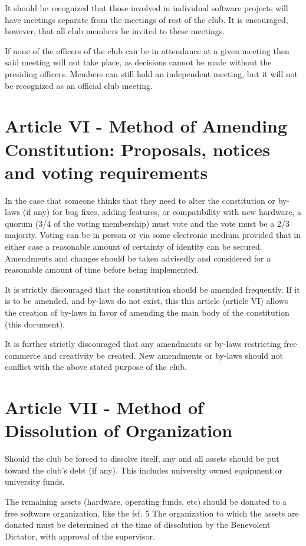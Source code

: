 \documentclass{article}
\begin{document}

	It should be recognized that those involved in individual software projects will have meetings separate from the meetings of rest of the club. It is encouraged, however, that all club members be invited to these meetings.

	If none of the officers of the club can be in attendance at a given meeting then said meeting will not take place, as decisions cannot be made without the presiding officers. Members can still hold an independent meeting, but it will not be recognized as an official club meeting.

	\section{Article VI - Method of Amending Constitution: Proposals, notices and voting requirements}

	In the case that someone thinks that they need to alter the constitution or by-laws (if any) for bug fixes, adding features, or compatibility with new hardware, a quorum (3/4 of the voting membership) must vote and the vote must be a 2/3 majority. Voting can be in person or via some electronic medium provided that in either case a reasonable amount of certainty of identity can be secured. Amendments and changes should be taken advisedly and considered for a reasonable amount of time before being implemented.

	It is strictly discouraged that the constitution should be amended frequently. If it is to be amended, and by-laws do not exist, this this article (article VI) allows the creation of by-laws in favor of amending the main body of the constitution (this document).

	It is further strictly discouraged that any amendments or by-laws restricting free commerce and creativity be created. New amendments or by-laws should not conflict with the above stated purpose of the club.

	\section{Article VII - Method of Dissolution of Organization}

	Should the club be forced to dissolve itself, any and all assets should be put toward the club's debt (if any). This includes university owned equipment or university funds.

	The remaining assets (hardware, operating funds, etc) should be donated to a free software organization, like the fsf. 5 The organization to which the assets are donated must be determined at the time of dissolution by the Benevolent Dictator, with approval of the supervisor.
\end{document}
